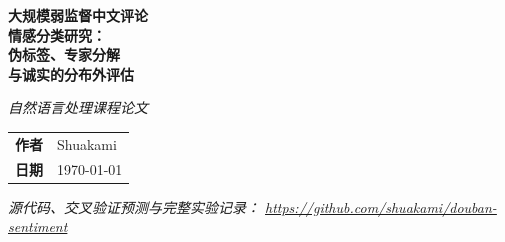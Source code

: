 \documentclass[11pt,a4paper]{article}
\begin{document}
\begin{titlepage}
\thispagestyle{empty}
\begin{center}
\vspace*{2.0cm}
{\LARGE\bfseries 大规模弱监督中文评论\\[6pt]
情感分类研究：\\[6pt]
伪标签、专家分解\\[6pt]
与诚实的分布外评估}\par
\vspace{0.9cm}
{\large\itshape 自然语言处理课程论文}
\par
\vspace{2.6cm}
\begin{tabular}{ll}
\textbf{作者}    & Shuakami \\
\textbf{日期}    & \today \\
\end{tabular}
\vfill
{\footnotesize\itshape
源代码、交叉验证预测与完整实验记录：
\url{https://github.com/shuakami/douban-sentiment}}
\end{center}
\end{titlepage}

\begin{abstract}
\begingroup
\small
\noindent
本文研究低资源条件下中文豆瓣电影短评的三分类情感分析（正面 / 中性 /
负面）。在仅有 600 条人工核验语义标签的现实设定下，我们结合一个包含
910{,}998 条评论的大规模弱标注语料开展研究。本文的贡献有四个方面。
第一，我们\emph{实测}了星级评分作为语义情感弱监督的可靠性：在
271{,}905 条高置信伪标签池上，仅约 59\% 的五星评论被预测为正面，三星
评论更多偏向负面而非中性。第二，我们证明用蒸馏集成对语料进行伪标注、
再用单一紧凑学生模型在 160K 条平衡样本上训练，可在金标集上达到
87.5\% 准确率、中性召回 84.8\%——这说明规模化的标签质量，而非模型
容量，才是约束瓶颈。第三，本文部署的系统将蒸馏 MacBERT 学生、冻结的
MegatronBERT-1.3B 特征判别器与语料训练的中性专家相结合，在 600 条
金标的交叉验证评估上达到 \textbf{89.5\% 准确率 / 85.9 宏平均 F1}
——第~\ref{sec:leakage}~节将表明该数字被二级教师泄漏与重复文本
折间泄漏所抬高
（泄漏修正估计：三分类 83.3--84.0\%、二分类 92.9\%）——
中性召回率由 54.3\% 提升至 70.7\%。第四，本文构建了
\textbf{lab2000}——一个包含 2{,}000 条跨影片评论、经双遍 LLM 盲标
（同一标注模型、不同 few-shot 视角）与
479 条人工终审的基准——实测金标训练的系统在野外短评上仅达
65.0\% 三分类准确率（ood1000 \emph{开发集}上）；但仅引入
1{,}000 条主动学习边界样本即可使
SFT 学生提升 +8.8pp（62.6\%$\to$71.4\%，McNemar
$p = 4.0\times10^{-8}$）；同一协议
经前沿 LLM 伪标签规模扩展（至 $\sim$17K 条主动选取样本）可将集成混合
推至开发集上 \textbf{三分类 77.1\%}（best-of-$N$ 估计；
各种子 74.6--76.3\%，
五种子平均 77.1\%——对各种子的概率输出取平均后再解码；
5 折交叉拟合验证；显著优于 1K AL 混合，
McNemar $p = 3.9\times10^{-4}$），并将二分类分布外准确率提升至
\textbf{92.3\%}。本文还揭示了三个在
$n{=}600$ 下不可见的经验观察：主动学习样本必须以金标锚定、领域偏移下
硬标签可能优于软蒸馏、以及星级评分恰恰在文本最歧义处成为最强信号。
本文完整记录了二十余种经过实测但被否决的架构方案。
\par\endgroup
\end{abstract}
\end{document}
